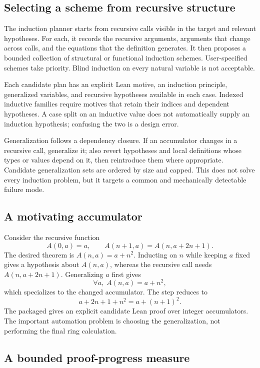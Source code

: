 \subsection{Selecting a scheme from recursive structure}

The induction planner starts from recursive calls visible in the target and relevant hypotheses. For each, it records the recursive arguments, arguments that change across calls, and the equations that the definition generates. It then proposes a bounded collection of structural or functional induction schemes. User-specified schemes take priority. Blind induction on every natural variable is not acceptable.

Each candidate plan has an explicit Lean motive, an induction principle, generalized variables, and recursive hypotheses available in each case. Indexed inductive families require motives that retain their indices and dependent hypotheses. A case split on an inductive value does not automatically supply an induction hypothesis; confusing the two is a design error.

Generalization follows a dependency closure. If an accumulator changes in a recursive call, generalize it; also revert hypotheses and local definitions whose types or values depend on it, then reintroduce them where appropriate. Candidate generalization sets are ordered by size and capped. This does not solve every induction problem, but it targets a common and mechanically detectable failure mode.

\subsection{A motivating accumulator}

Consider the recursive function
\[
 A(0,a)=a,\qquad A(n+1,a)=A(n,a+2n+1).
\]
The desired theorem is $A(n,a)=a+n^2$. Inducting on $n$ while keeping $a$ fixed gives a hypothesis about $A(n,a)$, whereas the recursive call needs $A(n,a+2n+1)$. Generalizing $a$ first gives
\[
  \forall a,\;A(n,a)=a+n^2,
\]
which specializes to the changed accumulator. The step reduces to
\[
 a+2n+1+n^2=a+(n+1)^2.
\]
The packaged  gives an explicit candidate Lean proof over integer accumulators. The important automation problem is choosing the generalization, not performing the final ring calculation.

\subsection{A bounded proof-progress measure}

